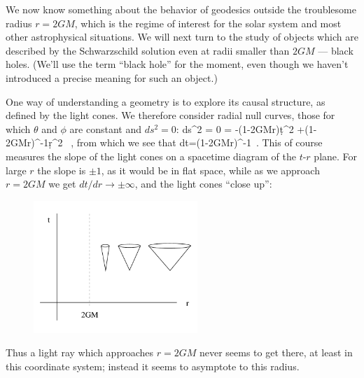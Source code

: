 \documentclass[12pt]{article}
\begin{document}
We now know something about the behavior of geodesics outside the 
troublesome radius $r=2GM$, which is the regime of interest for the
solar system and most other astrophysical situations.  We will next turn 
to the study of objects which are described by the Schwarzschild solution
even at radii smaller than $2GM$ --- black holes.  (We'll use the
term ``black hole'' for the moment, even though we haven't introduced
a precise meaning for such an object.)

One way of understanding a geometry is to explore its causal structure,
as defined by the light cones.  We therefore consider radial null curves, 
those for which $\theta$ and $\phi$ are constant and $ds^2=0$:
\be
  ds^2 = 0 = -\left(1-{{2GM}\over r}\right)\d t^2 
  +\left(1-{{2GM}\over r}\right)^{-1}\d r^2 \ ,\label{7.63}
\ee
from which we see that
\be
  {{dt}}=\pm \left(1-{{2GM}\over r}\right)^{-1}\ .\label{7.64}
\ee
This of course measures the slope of the light cones on a spacetime diagram
of the $t$-$r$ plane.  For large $r$ the slope is $\pm 1$, as it would
be in flat space, while as we approach $r=2GM$  we get $dt/dr\rightarrow
\pm\infty$, and the light cones ``close up'':

\begin{figure}[h]
  \centerline{
  \includegraphics[height=5cm]{pdf/seven9}}
\end{figure}

\noindent Thus a light ray which approaches $r=2GM$ never seems to
get there, at least in this coordinate system; instead it seems to
asymptote to this radius.
\end{document}
